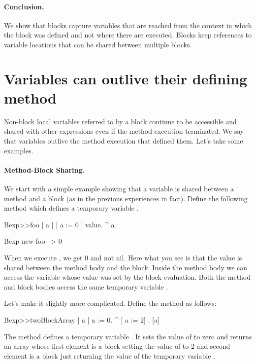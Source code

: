 \documentclass[a4paper,10pt,twoside]{book}
\begin{document}
\paragraph{Conclusion.} We show that blocks capture variables that are reached from the context in which the block was defined and not where there are executed. Blocks keep references to variable locations that can be shared between multiple blocks. 


\section{Variables can outlive their defining method}

Non-block local variables referred to by a block continue to be accessible and shared with other expressions even if the method execution terminated. We say that variables outlive the method execution that defined them.
Let's take some examples.

\paragraph{Method-Block Sharing.} We start with a simple example showing that a variable is shared between a method and a block (as in the previous experiences in fact). Define the following method  which defines a temporary variable .

\begin{code}{}
Bexp>>foo
	| a |
	[ a := 0 ] value.
	^ a
	
Bexp new foo
   --> 0	
\end{code}

When we execute , we get 0 and not nil.
Here what you see is that the value is shared between the method body and the block. Inside the method body we can access the variable whose value was set by the block evaluation.
Both the method  and block bodies access the same temporary variable .

Let's make it slightly more complicated. Define the method  as follows:

\begin{code}{}
Bexp>>twoBlockArray
	| a |
	a := 0.
	^ {[ a := 2] . [a]}
\end{code}

The method  defines a temporary variable . It sets the value of 
to zero and returns an array whose first element is a block setting the value of  to 2 and second element is a block just returning the value of the temporary variable .
\end{document}

